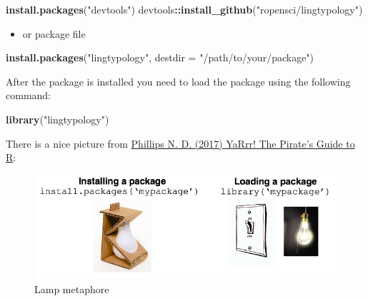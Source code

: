 \documentclass[]{book}
\newenvironment{Shaded}{\begin{snugshade}}{\end{snugshade}}
\newcommand{\KeywordTok}[1]{\textcolor[rgb]{0.13,0.29,0.53}{\textbf{#1}}}
\newcommand{\DataTypeTok}[1]{\textcolor[rgb]{0.13,0.29,0.53}{#1}}
\newcommand{\StringTok}[1]{\textcolor[rgb]{0.31,0.60,0.02}{#1}}
\newcommand{\OperatorTok}[1]{\textcolor[rgb]{0.81,0.36,0.00}{\textbf{#1}}}
\newcommand{\NormalTok}[1]{#1}
\providecommand{\tightlist}{%
  \setlength{\itemsep}{0pt}\setlength{\parskip}{0pt}}
\theoremstyle{definition}
\theoremstyle{definition}
\theoremstyle{definition}
\theoremstyle{remark}
\begin{document}
\begin{Shaded}
\begin{Highlighting}[]
\KeywordTok{install.packages}\NormalTok{(}\StringTok{"devtools"}\NormalTok{)}
\NormalTok{devtools}\OperatorTok{::}\KeywordTok{install_github}\NormalTok{(}\StringTok{"ropensci/lingtypology"}\NormalTok{)}
\end{Highlighting}
\end{Shaded}

\begin{itemize}
\tightlist
\item
  or package file
\end{itemize}

\begin{Shaded}
\begin{Highlighting}[]
\KeywordTok{install.packages}\NormalTok{(}\StringTok{"lingtypology"}\NormalTok{,}
                 \DataTypeTok{destdir =} \StringTok{"/path/to/your/package"}\NormalTok{)}
\end{Highlighting}
\end{Shaded}

After the package is installed you need to load the package using the
following command:

\begin{Shaded}
\begin{Highlighting}[]
\KeywordTok{library}\NormalTok{(}\StringTok{"lingtypology"}\NormalTok{)}
\end{Highlighting}
\end{Shaded}

There is a nice picture from
\href{https://bookdown.org/ndphillips/YaRrr/}{Phillips N. D. (2017)
YaRrr! The Pirate's Guide to R}:

\begin{figure}

{\centering \includegraphics[width=6.89in]{images/02-package} 

}

\caption{Lamp metaphore}\label{fig:lamp}
\end{figure}
\end{document}
